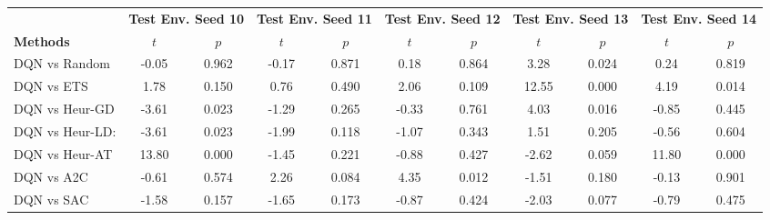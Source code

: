 \begin{tabular}{lcccccccccc}
	\toprule 
	& \multicolumn{2}{c}{\textbf{Test Env. Seed 10}} & \multicolumn{2}{c}{\textbf{Test Env. Seed 11}} & \multicolumn{2}{c}{\textbf{Test Env. Seed 12}} & \multicolumn{2}{c}{\textbf{Test Env. Seed 13}} & \multicolumn{2}{c}{\textbf{Test Env. Seed 14}} \\
	\cmidrule(lr){2-3} \cmidrule(lr){4-5} \cmidrule(lr){6-7} \cmidrule(lr){8-9} \cmidrule(lr){10-11}
	\textbf{Methods} &$t$                &$p$                         &$t$               &$p$                          &$t$               &$p$                          &$t$               &$p$                          &$t$               &$p$                          \\
	\midrule 
	DQN vs Random    & -0.05           & 0.962                 & -0.17          & 0.871                  & 0.18           & 0.864                  & 3.28           & 0.024                  & 0.24           & 0.819                  \\
	DQN vs ETS       & 1.78            & 0.150                 & 0.76           & 0.490                  & 2.06           & 0.109                  & 12.55          & 0.000                  & 4.19           & 0.014                  \\
	DQN vs Heur-GD   & -3.61           & 0.023                 & -1.29          & 0.265                  & -0.33          & 0.761                  & 4.03           & 0.016                  & -0.85          & 0.445                  \\
	DQN vs Heur-LD:  & -3.61           & 0.023                 & -1.99          & 0.118                  & -1.07          & 0.343                  & 1.51           & 0.205                  & -0.56          & 0.604                  \\
	DQN vs Heur-AT   & 13.80           & 0.000                 & -1.45          & 0.221                  & -0.88          & 0.427                  & -2.62          & 0.059                  & 11.80          & 0.000                  \\
	DQN vs A2C       & -0.61           & 0.574                 & 2.26           & 0.084                  & 4.35           & 0.012                  & -1.51          & 0.180                  & -0.13          & 0.901                  \\
	DQN vs SAC       & -1.58           & 0.157                 & -1.65          & 0.173                  & -0.87          & 0.424                  & -2.03          & 0.077                  & -0.79          & 0.475                  \\

\end{tabular}

